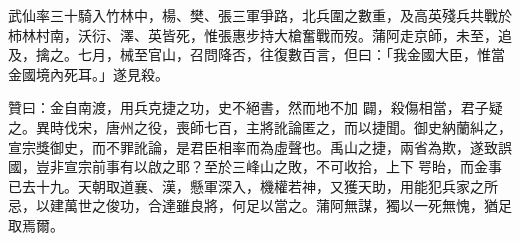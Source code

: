 \begin{pinyinscope}
 武仙率三十騎入竹林中，楊、樊、張三軍爭路，北兵圍之數重，及高英殘兵共戰於柿林村南，沃衍、澤、英皆死，惟張惠步持大槍奮戰而歿。蒲阿走京師，未至，追及，擒之。七月，械至官山，召問降否，往復數百言，但曰：「我金國大臣，惟當金國境內死耳。」遂見殺。



 贊曰：金自南渡，用兵克捷之功，史不絕書，然而地不加
 闢，殺傷相當，君子疑之。異時伐宋，唐州之役，喪師七百，主將訛論匿之，而以捷聞。御史納蘭糾之，宣宗獎御史，而不罪訛論，是君臣相率而為虛聲也。禹山之捷，兩省為欺，遂致誤國，豈非宣宗前事有以啟之耶？至於三峰山之敗，不可收拾，上下咢眙，而金事已去十九。天朝取道襄、漢，懸軍深入，機權若神，又獲天助，用能犯兵家之所忌，以建萬世之俊功，合達雖良將，何足以當之。蒲阿無謀，獨以一死無愧，猶足取焉爾。



\end{pinyinscope}